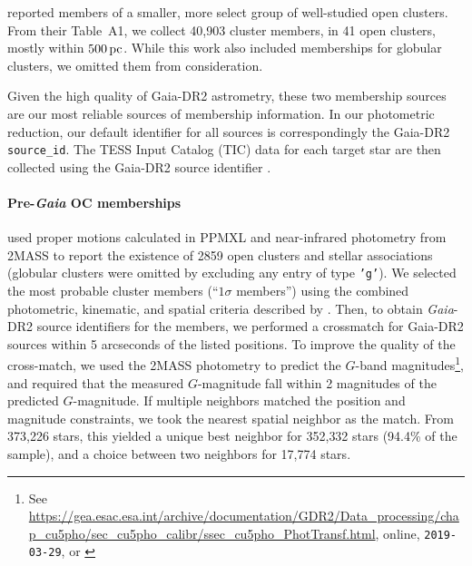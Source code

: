 \documentclass[12pt,twocolumn,tighten]{aastex62}
\begin{document}
\citet{gaia_hr_2018} reported members of a smaller, more select group
of well-studied open clusters. From their Table~A1, we collect
40{,}903 cluster members, in 41 open clusters, mostly within
$500\,{\rm pc}$. While this work also included memberships for
globular clusters, we omitted them from consideration.

Given the high quality of Gaia-DR2 astrometry, these two membership
sources are our most reliable sources of membership information.  In
our photometric reduction,  our default identifier for all sources is
correspondingly the Gaia-DR2 \texttt{source\_id}.  The TESS Input
Catalog (TIC) data for each target star are then collected using the
Gaia-DR2 source identifier \citep{stassun_TIC_2018,stassun_TIC8_2019}.  




\paragraph{Pre-{\it Gaia} OC memberships}
\citet{Kharchenko_et_al_2013} used proper motions calculated in PPMXL
\citep[][a combination of USNO-B1{.}0 and 2MASS
astrometry]{roeser_ppmxl_2010} and near-infrared photometry from 2MASS
\citep{skrutskie_tmass_2006} to report the existence of 2859 open
clusters and stellar associations (globular clusters were omitted by
excluding any entry of type \texttt{'g'}).  We selected the most
probable cluster members (``$1\sigma$ members'') using the combined
photometric, kinematic, and spatial criteria described by
\citet[][Section~3.3]{kharchenko_global_2012}.  Then, to obtain {\it
Gaia}-DR2 source identifiers for the members, we performed a
crossmatch for Gaia-DR2 sources within 5 arcseconds of the listed
positions.  To improve the quality of the cross-match, we used the
2MASS photometry to predict the $G$-band magnitudes\footnote{See
\url{https://gea.esac.esa.int/archive/documentation/GDR2/Data_processing/chap_cu5pho/sec_cu5pho_calibr/ssec_cu5pho_PhotTransf.html},
online, \texttt{2019-03-29}, or \citet{carrasco_gaia_2016}}, and
required that the measured $G$-magnitude fall within 2 magnitudes of
the predicted $G$-magnitude.  If multiple neighbors matched the
position and magnitude constraints, we took the nearest spatial
neighbor as the match.  From 373{,}226 stars, this yielded a unique
best neighbor for 352{,}332 stars (94.4\% of the sample), and a choice
between two neighbors for 17{,}774 stars. 
\end{document}
